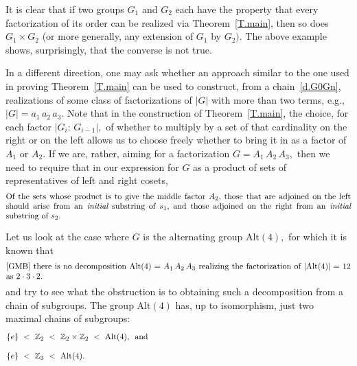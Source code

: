 \documentclass{amsart}
\numberwithin{equation}{section}
\numberwithin{theorem}{section}
\renewcommand{\r}{\mathrm}
\begin{document}
It is clear that if two groups $G_1$ and $G_2$ each have the
property that every factorization of its order can be realized
via Theorem~\ref{T.main}, then so does $G_1\times G_2$ (or more
generally, any extension of $G_1$ by $G_2).$
The above example shows, surprisingly, that the converse is not true.

In a different direction, one may ask whether an
approach similar to the one used in proving Theorem~\ref{T.main}
can be used to construct, from a chain~\eqref{d.G0Gn},
realizations of some class of
factorizations of $|G|$ with more than
two terms, e.g., $|G| = a_1\,a_2\,a_3.$
Note that in the construction of Theorem~\ref{T.main},
the choice, for each factor $|G_i:\,G_{i-1}|,$ of whether to
multiply by a set of that cardinality on the right or on the left
allows us to choose freely whether to bring it in as a factor
of $A_1$ or $A_2.$
If we are, rather, aiming for a factorization
$G = A_1\,A_2\,A_3,$ then we need to require
that in our expression for $G$ as a product of sets of
representatives of left and right cosets,
%
\begin{equation}\begin{minipage}[c]{35pc}\label{d.A2}
Of the sets whose product is to give the middle factor
$A_2,$ those that are adjoined on the left should arise from an
{\em initial} substring of $s_1,$ and those adjoined on the right
from an {\em initial} substring of~$s_2.$
\end{minipage}\end{equation}

Let us look at the case where $G$ is the
alternating group $\r{Alt}(4),$ for which it is known that
%
\begin{equation}\begin{minipage}[c]{35pc}\label{d.GMB_Prop}
\cite[Proposition~1.4]{GMB}
there is no decomposition $\r{Alt}(4) = A_1\,A_2\,A_3$ realizing
the factorization of $|\r{Alt}(4)| = 12$ as $2\cdot 3\cdot 2.$
\end{minipage}\end{equation}
%
and try to see what the obstruction is to obtaining
such a decomposition from a chain of subgroups.
The group $\r{Alt}(4)$
has, up to isomorphism, just two maximal chains of subgroups:
%
\begin{equation}\begin{minipage}[c]{35pc}\label{d.A4_long}
$\{e\}\ <\ \mathbb{Z}_2\ <\ %
\mathbb{Z}_2 \times \mathbb{Z}_2\ <\ \r{Alt}(4),$\ \ and
\end{minipage}\end{equation}
%
\begin{equation}\begin{minipage}[c]{35pc}\label{d.A4_short}
$\{e\}\ <\ \mathbb{Z}_3\ <\ \r{Alt}(4).$
\end{minipage}\end{equation}
\end{document}
